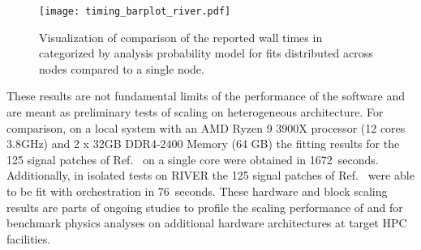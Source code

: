 

\begin{figure}[!htpb]
    \centering
    \texttt{[image: timing\_barplot\_river.pdf]}
    \caption{Visualization of comparison of the reported wall times in~ categorized by analysis probability model for fits distributed across nodes compared to a single node.}
    \label{fig:timing_barplot_river}
\end{figure}


These results are not fundamental limits of the performance of the software and are meant as preliminary tests of scaling on heterogeneous architecture.
For comparison, on a local system with an AMD Ryzen 9 3900X processor (12 cores 3.8GHz) and 2 x 32GB DDR4-2400 Memory (64 GB) the fitting results for the 125 signal patches of Ref.~\cite{ATLAS_SUSY_1Lbb_pallet} on a single core were obtained in 1672~seconds.
Additionally, in isolated tests on RIVER the 125 signal patches of Ref.~\cite{ATLAS_SUSY_1Lbb_pallet} were able to be fit with \funcX{} orchestration in 76~seconds.
These hardware and block scaling results are parts of ongoing studies to profile the scaling performance of \funcX{} and \pyhf{} for benchmark physics analyses on additional hardware architectures at target HPC facilities.

